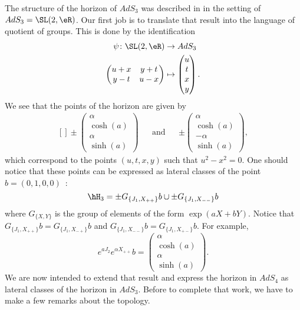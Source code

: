 The structure of the horizon of $AdS_3$ was described in \cite{Keio} in the setting of $AdS_3=\SL(2,\eR)$. Our first job is to translate that result into the language of quotient of groups. This is done by the identification
\begin{equation}
	\begin{aligned}
		\psi\colon \SL(2,\eR)&\to AdS_3 \\
		\begin{pmatrix}
			u+x	&	y+t	\\
			y-t	&	u-x
		\end{pmatrix}&\mapsto \begin{pmatrix}
			u	\\
			t	\\
			x	\\
			y
		\end{pmatrix}.
	\end{aligned}
\end{equation}
We see that the points of the horizon are given by
\begin{equation}			\label{EqHOrAdSTroisVecteur}
	\begin{aligned}[]
		\pm\begin{pmatrix}
			\alpha	\\
			\cosh(a)	\\
			\alpha	\\
			\sinh(a)
		\end{pmatrix}&&\text{and}&&\pm\begin{pmatrix}
			\alpha	\\
			\cosh(a)	\\
			-\alpha	\\
			\sinh(a)
		\end{pmatrix},
	\end{aligned}
\end{equation}
which correspond to the points $(u,t,x,y)$ such that $u^2-x^2=0$. One should notice that these points can be expressed as lateral classes of the point $b=(0,1,0,0)$~:
\begin{equation}
	\hH_3=\pm G_{\{ J_1,X_{++} \}}b\cup\pm G_{\{ J_1,X_{--} \}}b
\end{equation}
where $G_{\{ X,Y \}}$ is the group of elements of the form $\exp(aX+bY)$. Notice that $G_{\{ J_1,X_{++} \}}b=G_{\{ J_1,X_{-+} \}}b$ and $G_{\{ J_1,X_{--} \}}b=G_{\{ J_1,X_{+-} \}}b$. For example,
\begin{equation}
	e^{aJ_2} e^{\alpha X_{++}}b=\begin{pmatrix}
		\alpha	\\
		\cosh(a)	\\
		\alpha	\\
		\sinh(a)
	\end{pmatrix}.
\end{equation}
We are now intended to extend that result and express the horizon in $AdS_4$ as lateral classes of the horizon in $AdS_3$. Before to complete that work, we have to make a few remarks about the topology.


